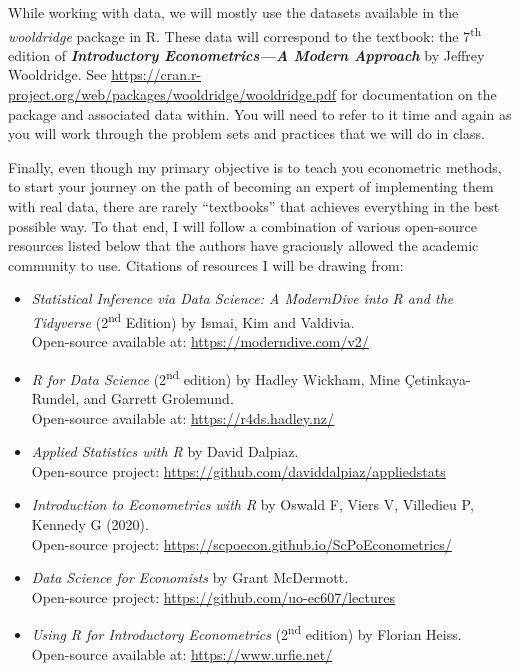 \documentclass[11pt]{article}
\begin{document}
While working with data, we will mostly use the datasets available in the
\emph{wooldridge} package in R. These data will correspond to the textbook: the
7\textsuperscript{th} edition of \textbf{\emph{Introductory Econometrics---A
Modern Approach}} by Jeffrey Wooldridge. See
\url{https://cran.r-project.org/web/packages/wooldridge/wooldridge.pdf} for
documentation on the package and associated data within. You will need to refer
to it time and again as you will work through the problem sets and practices
that we will do in class.

Finally, even though my primary objective is to teach you econometric methods,
to start your journey on the path of becoming an expert of implementing them
with real data, there are rarely ``textbooks'' that achieves everything in the
best possible way. To that end, I will follow a combination of various
open-source resources listed below that the authors have graciously allowed the
academic community to use. Citations of resources I will be drawing from:

\begin{itemize}
  \item \emph{Statistical Inference via Data Science: A ModernDive into R and
        the Tidyverse} (2\textsuperscript{nd} Edition) by Ismai, Kim and
        Valdivia. \\ Open-source available at: \url{https://moderndive.com/v2/}
  \item \emph{R for Data Science} (2\textsuperscript{nd} edition) by Hadley
        Wickham, Mine \c{C}etinkaya-Rundel, and Garrett Grolemund. \\
        Open-source available at: \url{https://r4ds.hadley.nz/}
  \item \emph{Applied Statistics with R} by David Dalpiaz. \\
        Open-source project: \url{https://github.com/daviddalpiaz/appliedstats}
  \item \emph{Introduction to Econometrics with R} by Oswald F, Viers V,
        Villedieu P, Kennedy G (2020). \\
        Open-source project: \url{https://scpoecon.github.io/ScPoEconometrics/}
  \item \emph{Data Science for Economists} by Grant McDermott. \\
        Open-source project: \url{https://github.com/uo-ec607/lectures}
  \item \emph{Using R for Introductory Econometrics} (2\textsuperscript{nd}
        edition) by Florian Heiss. \\
        Open-source available at: \url{https://www.urfie.net/}
\end{itemize}
\end{document}
